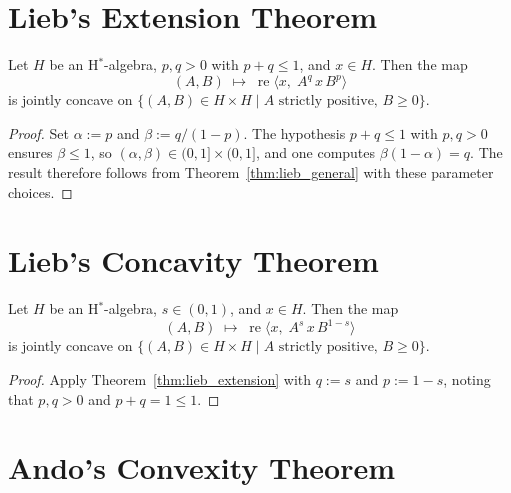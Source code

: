 \section{Lieb's Extension Theorem}

\begin{theorem}
  \label{thm:lieb_extension}
  \leanok
  Let $H$ be an H$^*$-algebra, $p, q > 0$ with $p + q \leq 1$, and $x \in H$.
  Then the map
  \[
    (A, B) \;\longmapsto\; \operatorname{re}\bigl\langle x,\;
      A^{q}\, x\, B^{p} \bigr\rangle
  \]
  is jointly concave on
  $\{(A, B) \in H \times H \mid A \text{ strictly positive},\, B \geq 0\}$.
  \begin{proof}
    \leanok
    Set $\alpha := p$ and $\beta := q / (1 - p)$.
    The hypothesis $p + q \leq 1$ with $p, q > 0$ ensures $\beta \leq 1$,
    so $(\alpha, \beta) \in (0,1] \times (0,1]$, and one computes
    $\beta(1-\alpha) = q$.
    The result therefore follows from Theorem~\ref{thm:lieb_general} with these
    parameter choices.
  \end{proof}
\end{theorem}

\section{Lieb's Concavity Theorem}

\begin{corollary}
  \label{thm:lieb}
  \leanok
  Let $H$ be an H$^*$-algebra, $s \in (0,1)$, and $x \in H$.
  Then the map
  \[
    (A, B) \;\longmapsto\; \operatorname{re}\bigl\langle x,\;
      A^{s}\, x\, B^{1-s} \bigr\rangle
  \]
  is jointly concave on
  $\{(A, B) \in H \times H \mid A \text{ strictly positive},\, B \geq 0\}$.
  \begin{proof}
    \leanok
    Apply Theorem~\ref{thm:lieb_extension} with $q := s$ and $p := 1 - s$,
    noting that $p, q > 0$ and $p + q = 1 \leq 1$.
  \end{proof}
\end{corollary}

\section{Ando's Convexity Theorem}

